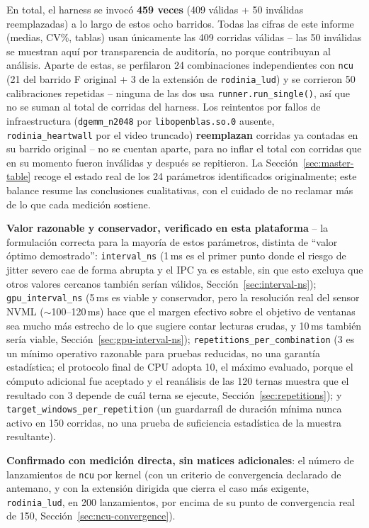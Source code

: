 En total, el harness se invocó \textbf{459 veces} (409 válidas + 50
inválidas reemplazadas) a lo largo de estos ocho barridos. Todas las
cifras de este informe (medias, CV\%, tablas) usan únicamente las 409
corridas válidas -- las 50 inválidas se muestran aquí por transparencia de
auditoría, no porque contribuyan al análisis. Aparte de estas, se
perfilaron 24 combinaciones independientes con
\texttt{ncu} (21 del barrido F original + 3 de la extensión de
\texttt{rodinia\_lud}) y se corrieron 50 calibraciones repetidas -- ninguna
de las dos usa \texttt{runner.run\_single()}, así que no se suman al total
de corridas del harness. Los reintentos por fallos de infraestructura
(\texttt{dgemm\_n2048} por \texttt{libopenblas.so.0} ausente,
\texttt{rodinia\_heartwall} por el video truncado) \textbf{reemplazan}
corridas ya contadas en su barrido original -- no se cuentan aparte, para
no inflar el total con corridas que en su momento fueron inválidas y
después se repitieron. La Sección~\ref{sec:master-table} recoge el estado
real de los 24 parámetros identificados originalmente; este balance resume
las conclusiones cualitativas, con el cuidado de no reclamar más de lo que
cada medición sostiene.

\textbf{Valor razonable y conservador, verificado en esta plataforma} --
la formulación correcta para la mayoría de estos parámetros, distinta de
``valor óptimo demostrado'': \texttt{interval\_ns} (1\,ms es el primer
punto donde el riesgo de jitter severo cae de forma abrupta y el IPC ya es
estable, sin que esto excluya que otros valores cercanos también serían
válidos, Sección~\ref{sec:interval-ns}); \texttt{gpu\_interval\_ns} (5\,ms
es viable y conservador, pero la resolución real del sensor NVML
($\sim$100--120\,ms) hace que el margen efectivo sobre el objetivo de
ventanas sea mucho más estrecho de lo que sugiere contar lecturas crudas,
y 10\,ms también sería viable, Sección~\ref{sec:gpu-interval-ns});
\texttt{repetitions\_per\_combination} (3 es un mínimo operativo razonable
para pruebas reducidas, no una garantía estadística; el protocolo final de
CPU adopta 10, el máximo evaluado, porque el cómputo adicional fue aceptado
y el reanálisis de las 120 ternas muestra que el resultado con 3 depende de
cuál terna se ejecute,
Sección~\ref{sec:repetitions}); y \texttt{target\_windows\_per\_repetition}
(un guardarraíl de duración mínima nunca activo en 150 corridas, no una
prueba de suficiencia estadística de la muestra resultante).

\textbf{Confirmado con medición directa, sin matices adicionales}: el
número de lanzamientos de \texttt{ncu} por kernel (con un criterio de
convergencia declarado de antemano, y con la extensión dirigida que cierra
el caso más exigente, \texttt{rodinia\_lud}, en 200 lanzamientos, por
encima de su punto de convergencia real de 150,
Sección~\ref{sec:ncu-convergence}).

